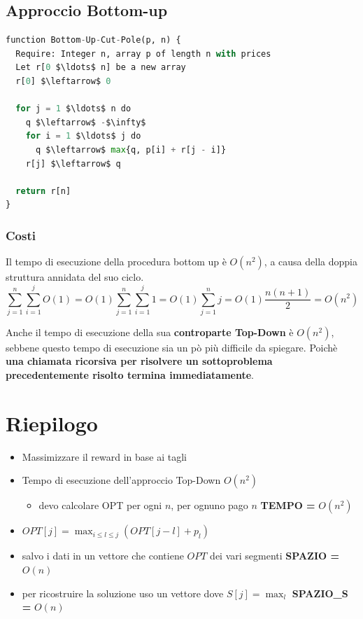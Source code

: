 \subsection{Approccio Bottom-up}

\begin{lstlisting}[language=Python, mathescape=true]
function Bottom-Up-Cut-Pole(p, n) {
  Require: Integer n, array p of length n with prices
  Let r[0 $\ldots$ n] be a new array
  r[0] $\leftarrow$ 0

  for j = 1 $\ldots$ n do
    q $\leftarrow$ -$\infty$
    for i = 1 $\ldots$ j do
      q $\leftarrow$ max{q, p[i] + r[j - i]}
    r[j] $\leftarrow$ q

  return r[n]
}
\end{lstlisting}

\subsubsection{Costi}

Il tempo di esecuzione della procedura bottom up è $O(n^2)$, a causa
della doppia struttura annidata del suo ciclo.
$$
  \sum^n_{j=1} \sum^j_{i=1} O(1) = O(1) \sum^n_{j=1} \sum^j_{i=1} 1 = O(1) \sum^n_{j=1} j = O(1) \frac{n(n+1)}{2} = O(n^2)
$$

Anche il tempo di esecuzione della sua \textbf{controparte Top-Down} è
$O(n^2)$, sebbene questo tempo di esecuzione sia un pò più difficile
da spiegare. Poichè \textbf{una chiamata ricorsiva per risolvere un
  sottoproblema precedentemente risolto termina immediatamente}.

\section{Riepilogo}

\begin{itemize}
  \item
        Massimizzare il reward in base ai tagli
  \item
        Tempo di esecuzione dell'approccio Top-Down $O(n^2)$

        \begin{itemize}
          \item
                devo calcolare OPT per ogni $n$, per ognuno pago $n$ \textbf{TEMPO =}
                $O(n^2)$
        \end{itemize}
  \item
        $OPT[j] = \max_{i \le l \le j} (OPT[j-l] + p_l)$
  \item
        salvo i dati in un vettore che contiene $OPT$ dei vari segmenti
        \textbf{SPAZIO =} $O(n)$
  \item
        per ricostruire la soluzione uso un vettore dove $S[j] = \max_l$
        \textbf{SPAZIO\_S =} $O(n)$
\end{itemize}
